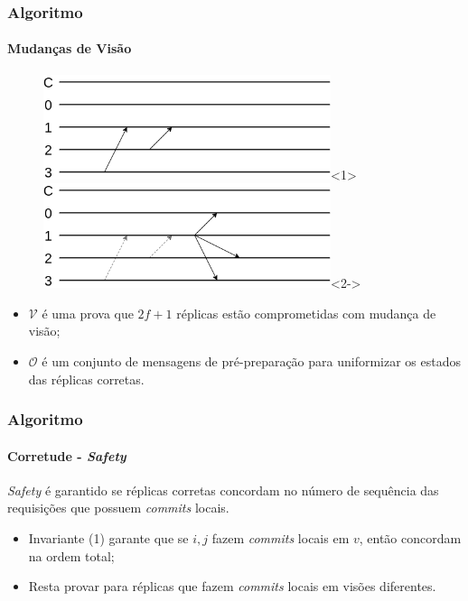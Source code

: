 \documentclass{beamer}
\begin{document}
\begin{frame}
  \frametitle{Algoritmo}
  \framesubtitle{Mudanças de Visão}

  \begin{figure}
    \includegraphics[width=0.75\textwidth]{images/view-change01}<1>
    \includegraphics[width=0.75\textwidth]{images/view-change02}<2->
  \end{figure}
  \pause
  \begin{itemize}
    \item
      $\mathcal{V}$ é uma prova que $2f + 1$ réplicas estão comprometidas com mudança de visão;

    \item
      $\mathcal{O}$ é um conjunto de mensagens de pré-preparação para uniformizar os estados das réplicas corretas.
  \end{itemize}
\end{frame}

\begin{frame}
  \frametitle{Algoritmo}
  \framesubtitle{Corretude - \textit{Safety}}

  \textit{Safety} é garantido se réplicas corretas concordam no número de sequência das requisições que possuem \textit{commits} locais.
  \begin{itemize}
    \item
      Invariante (1) garante que se $i, j$ fazem \textit{commits} locais em $v$, então concordam na ordem total;

    \item
      Resta provar para réplicas que fazem \textit{commits} locais em visões diferentes.
  \end{itemize}
\end{frame}
\end{document}
